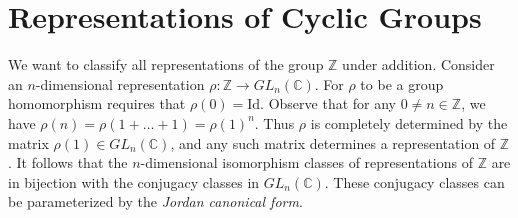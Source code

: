 \section{Representations of Cyclic Groups}
\begin{example}
We want to classify all representations of the group $\mathbb{Z}$ under addition.  Consider an $n$-dimensional representation $\rho \colon \mathbb{Z} \to GL_n (\mathbb{C})$.  For $\rho$ to be a group homomorphism requires that $\rho(0) = \text{Id}$.  Observe that for any $0 \neq n \in \mathbb{Z}$, we have $\rho(n) = \rho( 1 + \ldots + 1) = \rho(1)^n$.  Thus $\rho$ is completely determined by the matrix $\rho(1) \in GL_n(\mathbb{C})$, and any such matrix determines a representation of $\mathbb{Z}$.  It follows that the $n$-dimensional isomorphism classes of representations of $\mathbb{Z}$ are in bijection with the conjugacy classes in $GL_n(\mathbb{C})$.  These conjugacy classes can be parameterized by the \textit{Jordan canonical form}.
\end{example}

